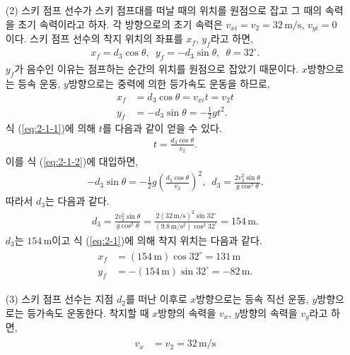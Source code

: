 \documentclass[floatfix,nofootinbib,superscriptaddress,fleqn]{revtex4-2}
\begin{document}
\begin{itemize}
  \item[(2)] 스키 점프 선수가 스키 점프대를 떠날 때의 위치를 원점으로 잡고 
  그 때의 속력을 초기 속력이라고 하자. 각 방향으로의 초기 속력은 
  $v_{xi}=v_2=32\,\mathrm{m/s}$, $v_{yi}=0$이다. 
  스키 점프 선수의 착지 위치의 좌표를 $x_f$, $y_f$라고 하면,
  \begin{align}\label{eq:2-1}
    x_f = d_3\cos{\theta},\,\,\, y_f 
    = -d_3\sin{\theta},\,\,\,\theta=32^\circ.
  \end{align}
  $y_f$가 음수인 이유는 점프하는 순간의 위치를 원점으로 잡았기 때문이다. 
  $x$방향으로는 등속 운동, $y$방향으로는 중력에 의한 등가속도 운동을 하므로,
  \begin{align}
    \label{eq:2-1-1}
    x_f &= d_3\cos{\theta} = v_{xi}t = v_2t \\
    \label{eq:2-1-2}
    y_f &= -d_3\sin{\theta}=-\frac{1}{2}gt^2.
  \end{align}
  식 (\ref{eq:2-1-1})에 의해 $t$를 다음과 같이 얻을 수 있다.  
  \begin{align}\label{eq:2-1-3}
    t = \frac{d_3\cos{\theta}}{v_2}.
  \end{align}
  이를 식 (\ref{eq:2-1-2})에 대입하면,
  \begin{align}
    -d_3\sin{\theta}
    =-\frac{1}{2}g\left(\frac{d_3\cos{\theta}}{v_2}\right)^2,\,\,\,
    d_3 = \frac{2v^2_2\sin{\theta}}{g\cos^2{\theta}}.
  \end{align}
  따라서 $d_3$는 다음과 같다.
  \begin{align}\label{eq:2-2}
    d_3 = \frac{2v^2_2\sin{\theta}}{g\cos^2{\theta}}
    =\frac{2(32\,\mathrm{m/s})^2\sin{32^\circ}}
    {(9.8\,\mathrm{m/s^2})\cos^2{32^\circ}}
    =154\,\mathrm{m}.
  \end{align}
  $d_3$는 $154\,\mathrm{m}$이고 식 (\ref{eq:2-1})에 의해
   착지 위치는 다음과 같다.
\begin{align}
  \begin{split}\label{eq:2-3}
    x_f &= (154\,\mathrm{m})\cos{32^\circ}=131\,\mathrm{m} \\
    y_f &= -(154\,\mathrm{m})\sin{32^\circ}=-82\,\mathrm{m}.
  \end{split}
\end{align}
  \item[(3)] 스키 점프 선수는 지점 $d_2$를 떠난 이후로 $x$방향으로는 
  등속 직선 운동, $y$방향으로는 등가속도 운동한다. 착지할 때 $x$방향의 
  속력을 $v_x$, $y$방향의 속력을 $v_y$라고 하면,
  \begin{align}
    \begin{split}
      v_x &= v_2 = 32\,\mathrm{m/s}\\

\end{split}
\end{align}
\end{itemize}
\end{document}
